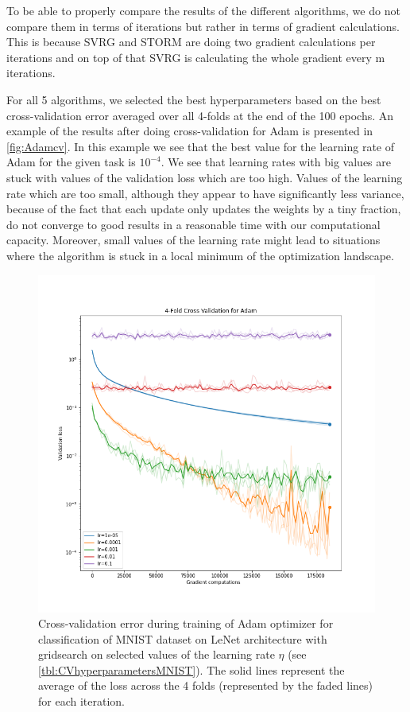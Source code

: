 \documentclass[a4paper,11pt,oneside]{report}
\begin{document}
To be able to properly compare the results of the different algorithms, we do not compare them in terms of iterations but rather in terms of gradient calculations. This is because SVRG and STORM are doing two gradient calculations per iterations and on top of that SVRG is calculating the whole gradient every m iterations.

For all 5 algorithms, we selected the best hyperparameters based on the best cross-validation error averaged over all 4-folds at the end of the 100 epochs. An example of the results after doing cross-validation for Adam is presented in \autoref{fig:Adamcv}. In this example we see that the best value for the learning rate of Adam for the given task is $10^{-4}$. We see that learning rates with big values are stuck with values of the validation loss which are too high. Values of the learning rate which are too small, although they appear to have significantly less variance, because of the fact that each update only updates the weights by a tiny fraction, do not converge to good results in a reasonable time with our computational capacity. Moreover, small values of the learning rate might lead to situations where the algorithm is stuck in a local minimum of the optimization landscape. 

\begin{figure}
    \centering
    \includegraphics[width=\columnwidth]{midterm presentation/images/AdamCV.png}
    \caption{Cross-validation error during training of Adam optimizer for classification of MNIST dataset on LeNet architecture with gridsearch on selected values of the learning rate $\eta$ (see \autoref{tbl:CVhyperparametersMNIST}). The solid lines represent the average of the loss across the 4 folds (represented by the faded lines) for each iteration.}
    \label{fig:Adamcv}
\end{figure}
\end{document}
